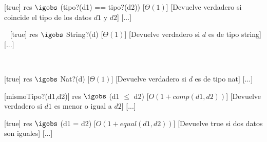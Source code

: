\begin{Interfaz}
  [true] %
  {res $\igobs$ (tipo?(d1) == tipo?(d2))} %
  [$\Theta(1)$] %
  [Devuelve verdadero si coincide el tipo de los datos $d1$ y $d2$] %
  [...] %
  
  ~
  [true] %
  {res $\igobs$ String?(d)} %
  [$\Theta(1)$] %
  [Devuelve verdadero si $d$ es de tipo string] %
  [...] %
  
  ~

  [true] %
  {res $\igobs$ Nat?(d)} %
  [$\Theta(1)$] %
  [Devuelve verdadero si $d$ es de tipo nat] %
  [...] %
  ~



[mismoTipo?(d1,d2)] %
{res $\igobs$ (d1 $\leq$ d2)} %
[$O(1 + comp(d1,d2))$] %
[Devuelve verdadero si $d1$ es menor o igual a $d2$] %
[...] %
  ~
  
[true] %
{res $\igobs$ (d1 = d2)} %
[$O(1 + equal(d1,d2))$] %
[Devuelve true si dos datos son iguales] %
[...] %


\end{Interfaz} 

